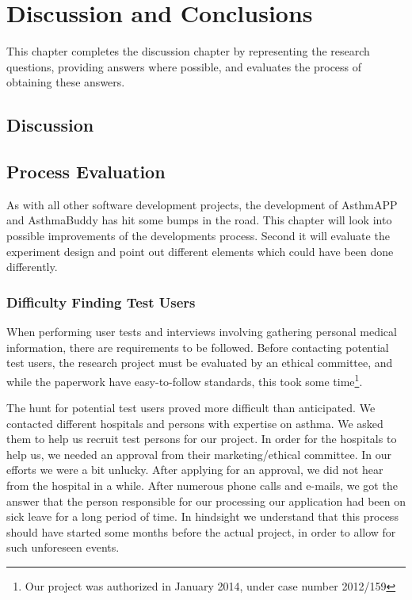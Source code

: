 \chapter{Discussion and Conclusions}
\label{chp:masterconclusion}

This chapter completes the discussion chapter by representing the research questions, providing answers where possible, and evaluates the process of obtaining these answers. 

\section{Discussion}
\label{sec:discussion}




\section{Process Evaluation}
\label{sec:processevaluation}
As with all other software development projects, the development of AsthmAPP and AsthmaBuddy has hit some bumps in the road. This chapter will look into possible improvements of the developments process. Second it will evaluate the experiment design and point out different elements which could have been done differently.

\subsection{Difficulty Finding Test Users}
\label{sec:difficultyfindingtestusers}
When performing user tests and interviews involving gathering personal medical information, there are requirements to be followed. Before contacting potential test users, the research project must be evaluated by an ethical committee, and while the paperwork have easy-to-follow standards, this took some time\footnote{Our project was authorized in January 2014, under case number 2012/159}. 

The hunt for potential test users proved more difficult than anticipated. We contacted different hospitals and persons with expertise on asthma. We asked them to help us recruit test persons for our project. In order for the hospitals to help us, we needed an approval from their marketing/ethical committee. In our efforts we were a bit unlucky. After applying for an approval, we did not hear from the hospital in a while. After numerous phone calls and e-mails, we got the answer that the person responsible for our processing our application had been on sick leave for a long period of time. In hindsight we understand that this process should have started some months before the actual project, in order to allow for such unforeseen events. 


